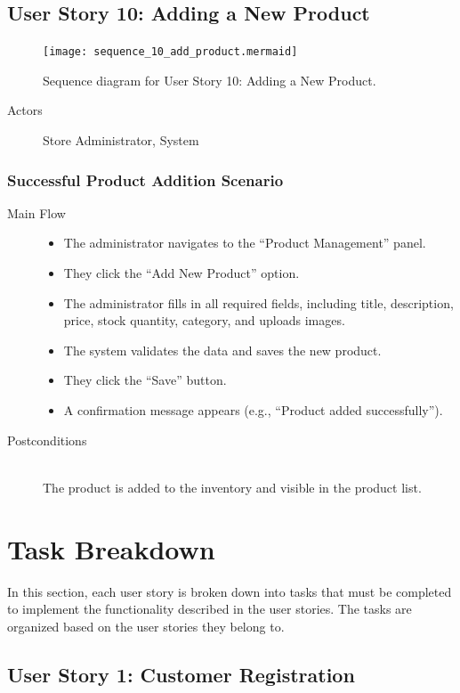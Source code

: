 \documentclass[twoside,a4paper,journal]{IEEEtran}
\begin{document}
\subsection{User Story 10: Adding a New Product}
\begin{figure}[!t]
\centering
\texttt{[image: sequence\_10\_add\_product.mermaid]}
\caption{Sequence diagram for User Story 10: Adding a New Product.}
\label{fig:sequence_10}
\end{figure}
\begin{description}
  \item[Actors] Store Administrator, System
\end{description}
\subsubsection{Successful Product Addition Scenario}
\begin{description}
  \item[Main Flow] \hfill
    \begin{itemize}
      \item The administrator navigates to the ``Product Management'' panel.
      \item They click the ``Add New Product'' option.
      \item The administrator fills in all required fields, including title,
        description, price, stock quantity, category, and uploads images.
      \item The system validates the data and saves the new product.
      \item They click the ``Save'' button.
      \item A confirmation message appears
        (e.g., ``Product added successfully'').
    \end{itemize}
  \item[Postconditions] \hfill \\
    The product is added to the inventory and visible in the product list.
\end{description}

\section{Task Breakdown}
In this section, each user story is broken down into tasks that must be
completed to implement the functionality described in the user stories.
The tasks are organized based on the user stories they belong to.

\subsection{User Story 1: Customer Registration}
\end{document}
